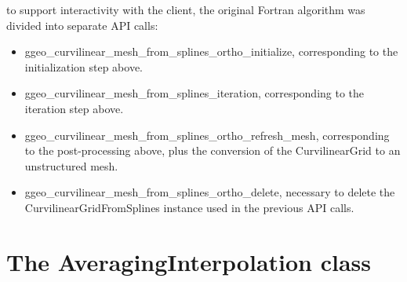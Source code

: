 \documentclass[biblatex]{deltares_manual}
\begin{document}
to support interactivity with the client, the original Fortran algorithm was divided into separate API calls:
\begin{itemize}
\item ggeo\_curvilinear\_mesh\_from\_splines\_ortho\_initialize, corresponding to the initialization step above.
\item ggeo\_curvilinear\_mesh\_from\_splines\_iteration, corresponding to the iteration step above.
\item ggeo\_curvilinear\_mesh\_from\_splines\_ortho\_refresh\_mesh, corresponding to the post-processing above, plus the conversion of the CurvilinearGrid to an unstructured mesh.
\item ggeo\_curvilinear\_mesh\_from\_splines\_ortho\_delete, necessary to delete the CurvilinearGridFromSplines instance used in the previous API calls.
\end{itemize}
\chapter{The AveragingInterpolation class}
\end{document}
